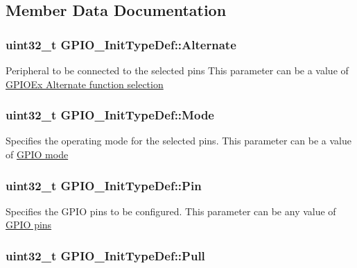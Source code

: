 \subsection{Member Data Documentation}
\hypertarget{struct_g_p_i_o___init_type_def_aa1bf7132c974a10589d6574d50465256}{
\subsubsection[{Alternate}]{\setlength{\rightskip}{0pt plus 5cm}uint32\-\_\-t G\-P\-I\-O\-\_\-\-Init\-Type\-Def\-::\-Alternate}}\label{struct_g_p_i_o___init_type_def_aa1bf7132c974a10589d6574d50465256}
Peripheral to be connected to the selected pins This parameter can be a value of \hyperlink{group___g_p_i_o_ex___alternate__function__selection}{G\-P\-I\-O\-Ex Alternate function selection} \hypertarget{struct_g_p_i_o___init_type_def_a3731d84343e65a98fdf51056a8d30321}{
\subsubsection[{Mode}]{\setlength{\rightskip}{0pt plus 5cm}uint32\-\_\-t G\-P\-I\-O\-\_\-\-Init\-Type\-Def\-::\-Mode}}\label{struct_g_p_i_o___init_type_def_a3731d84343e65a98fdf51056a8d30321}
Specifies the operating mode for the selected pins. This parameter can be a value of \hyperlink{group___g_p_i_o__mode}{G\-P\-I\-O mode} \hypertarget{struct_g_p_i_o___init_type_def_aa807fb62b2b2cf937092abba81370b87}{
\subsubsection[{Pin}]{\setlength{\rightskip}{0pt plus 5cm}uint32\-\_\-t G\-P\-I\-O\-\_\-\-Init\-Type\-Def\-::\-Pin}}\label{struct_g_p_i_o___init_type_def_aa807fb62b2b2cf937092abba81370b87}
Specifies the G\-P\-I\-O pins to be configured. This parameter can be any value of \hyperlink{group___g_p_i_o__pins}{G\-P\-I\-O pins} \hypertarget{struct_g_p_i_o___init_type_def_aa2d3a6b0c4e10ac20882b4a37799ced1}{
\subsubsection[{Pull}]{\setlength{\rightskip}{0pt plus 5cm}uint32\-\_\-t G\-P\-I\-O\-\_\-\-Init\-Type\-Def\-::\-Pull}}\label{struct_g_p_i_o___init_type_def_aa2d3a6b0c4e10ac20882b4a37799ced1}
